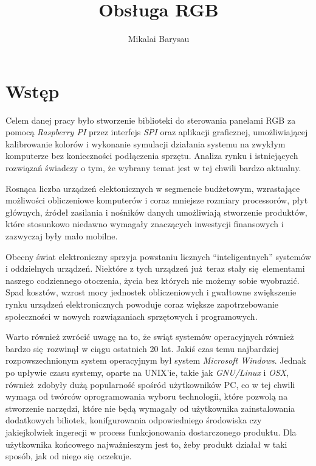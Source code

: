 \documentclass[eng,printmode]{mgr}
\title{Obsługa RGB}
\author{Mikalai Barysau}
\begin{document}

\maketitle

\tableofcontents %

\chapter*{Wstęp}
Celem danej pracy było stworzenie biblioteki do sterowania panelami RGB za pomocą \emph{Raspberry PI} przez interfejs \emph{SPI} oraz aplikacji graficznej, umożliwiającej kalibrowanie kolorów i wykonanie symulacji działania systemu na zwykłym komputerze bez konieczności podłączenia sprzętu. Analiza rynku i istniejących rozwiązań świadczy o tym, że wybrany temat jest w tej chwili bardzo aktualny. 

Rosnąca liczba urządzeń elektonicznych w segmencie budżetowym, wzrastające możliwości obliczeniowe komputerów i coraz mniejsze rozmiary processorów, płyt głównych, źródeł zasilania i nośników danych umożliwiają stworzenie produktów, które stosunkowo niedawno wymagały znaczących inwestycji finansowych i zazwyczaj były mało mobilne. 

Obecny świat elektroniczny sprzyja powstaniu licznych ``inteligentnych'' systemów i oddzielnych urządzeń. Niektóre z tych urządzeń już teraz stały się elementami naszego codziennego otoczenia, życia bez których nie możemy sobie wyobrazić. Spad kosztów, wzrost mocy jednostek obliczeniowych i gwałtowne zwiększenie rynku urządzeń elektronicznych powoduje coraz większe zapotrzebowanie społeczności w nowych rozwiązaniach sprzętowych i programowych. 

Warto również zwrócić uwagę na to, że swiąt systemów operacyjnych również bardzo się rozwinął w ciągu ostatnich 20 lat. Jakiś czas temu najbardziej rozpowszechnionym system operacyjnym był system \emph{Microsoft Windows}. Jednak po upływie czasu systemy, oparte na UNIX'ie, takie jak \emph{GNU/Linux} i \emph{OSX}, również zdobyły dużą popularność spośród użytkowników PC, co w tej chwili wymaga od twórców oprogramowania wyboru technologii, które pozwolą na stworzenie narzędzi, które nie będą wymagały od użytkownika zainstalowania dodatkowych biliotek, konifgurowania odpowiedniego środowiska czy jakiejkolwiek ingerecji w process funkcjonowania dostarczonego produktu. Dla użytkownika końcowego najważnieszym jest to, żeby produkt działał w taki sposób, jak od niego się oczekuje. 
\end{document}
